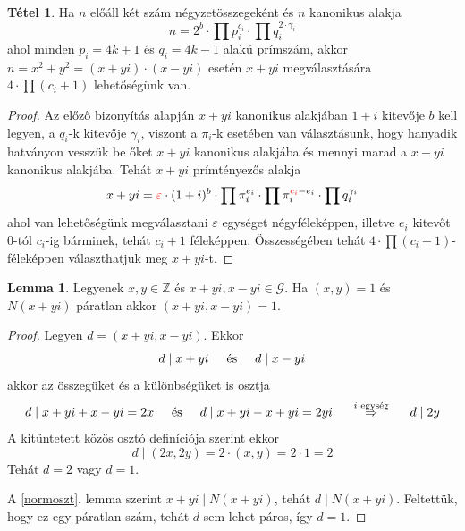 \documentclass[12pt]{book}
\theoremstyle{plain} %
\theoremstyle{definition} %
\newtheorem{lem/}{Lemma}[section]
\newenvironment{lem}
  {\renewcommand{\qedsymbol}{$\clubsuit$}%
   \pushQED{\qed}\begin{lem/}}
  {\popQED\end{lem/}}
\newtheorem{theo/}{Tétel}[section]
\newenvironment{theo}
  {\renewcommand{\qedsymbol}{$\clubsuit$}%
   \pushQED{\qed}\begin{theo/}}
  {\popQED\end{theo/}}
\theoremstyle{remark}
\renewcommand\qedsymbol{$\blacksquare$}
\numberwithin{equation}{section}  %
\def\Z{\mathbb{Z}}
\def\G{\mathcal{G}}
\begin{document}
	
	\begin{theo}
		Ha $n$ előáll két szám négyzetösszegeként és $n$ kanonikus alakja
		\[ n = 2^b \cdot \prod p_i^{c_i} \cdot \prod q_i^{2\cdot \gamma_i}  \]
		ahol minden $p_i=4k+1$ és $q_i = 4k-1$ alakú prímszám, akkor $n=x^2+y^2=(x+yi)\cdot (x-yi)$ esetén $x+yi$ megválasztására $4\cdot \prod (c_i+1)$ lehetőségünk van.
	\end{theo}

	\begin{proof}
		Az előző bizonyítás alapján $x+yi$ kanonikus alakjában $1+i$ kitevője $b$ kell legyen, a $q_i$-k kitevője $\gamma_i$, viszont a $\pi_i$-k esetében van választásunk, hogy hanyadik hatványon vesszük be őket $x+yi$ kanonikus alakjába és mennyi marad a $x-yi$ kanonikus alakjába. Tehát $x+yi$ prímtényezős alakja
		\[ x+yi = \color{red} \varepsilon \color{black} \cdot (1+i)^b \cdot \prod \pi_i^{e_i} \cdot \prod \pi_i^{\color{red} c_i \color{black}-e_i} \cdot \prod q_i^{\gamma_i}  \]
		ahol van lehetőségünk megválasztani $\varepsilon$ egységet négyféleképpen, illetve $e_i$ kitevőt $0$-tól $c_i$-ig bárminek, tehát $c_i+1$ féleképpen. Összességében tehát $4\cdot \prod (c_i+1)$-féleképpen választhatjuk meg $x+yi$-t.
	\end{proof}
	
	
	\begin{lem}\label{pitlem}
		Legyenek $x,y\in \Z$ és $x+yi, x-yi\in \G$. Ha $(x,y)=1$ és $N(x+yi)$ páratlan akkor $(x+yi,x-yi)=1$.
	\end{lem}

	\begin{proof}
		Legyen $d=(x+yi,x-yi)$. Ekkor
		\[ d\mid x+yi \hspace{5mm} \text{és} \hspace{5mm} d\mid x-yi \]
		akkor az összegüket és a különbségüket is osztja
		\[ d\mid x+yi+x-yi = 2x  \hspace{5mm} \text{és} \hspace{5mm} d\mid x+yi-x+yi = 2yi \hspace{5mm} \stackrel{i\text{ egység}}{\Rightarrow} \hspace{5mm} d\mid 2y   \]
		A kitüntetett közös osztó definíciója szerint ekkor
		\[ d\mid (2x,2y) = 2\cdot (x,y) = 2\cdot 1 = 2  \]
		Tehát $d=2$ vagy $d=1$.
		
		A \ref{normoszt}. lemma szerint $x+yi\mid N(x+yi)$, tehát $d\mid N(x+yi)$. Feltettük, hogy ez egy páratlan szám, tehát $d$ sem lehet páros, így $d=1$.
	\end{proof}
	
\end{document}
